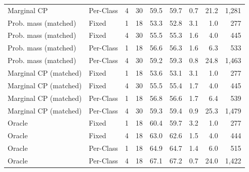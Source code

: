 \begin{tabular}{llrrrrrrr}
Marginal CP & Per-Class & 4 & 30 & 59.5 & 59.7 & 0.7 & 21.2 & 1,281 \\
Prob. mass (matched) & Fixed & 1 & 18 & 53.3 & 52.8 & 3.1 & 1.0 & 277 \\
Prob. mass (matched) & Fixed & 4 & 30 & 55.5 & 55.3 & 1.6 & 4.0 & 445 \\
Prob. mass (matched) & Per-Class & 1 & 18 & 56.6 & 56.3 & 1.6 & 6.3 & 533 \\
Prob. mass (matched) & Per-Class & 4 & 30 & 59.2 & 59.3 & 0.8 & 24.8 & 1,463 \\
Marginal CP (matched) & Fixed & 1 & 18 & 53.6 & 53.1 & 3.1 & 1.0 & 277 \\
Marginal CP (matched) & Fixed & 4 & 30 & 55.5 & 55.4 & 1.7 & 4.0 & 445 \\
Marginal CP (matched) & Per-Class & 1 & 18 & 56.8 & 56.6 & 1.7 & 6.4 & 539 \\
Marginal CP (matched) & Per-Class & 4 & 30 & 59.3 & 59.4 & 0.9 & 25.3 & 1,479 \\
Oracle & Fixed & 1 & 18 & 60.4 & 59.7 & 3.2 & 1.0 & 277 \\
Oracle & Fixed & 4 & 18 & 63.0 & 62.6 & 1.5 & 4.0 & 444 \\
Oracle & Per-Class & 1 & 18 & 64.9 & 64.7 & 1.4 & 6.0 & 515 \\
Oracle & Per-Class & 4 & 18 & 67.1 & 67.2 & 0.7 & 24.0 & 1,422 \\
\bottomrule
\end{tabular}
